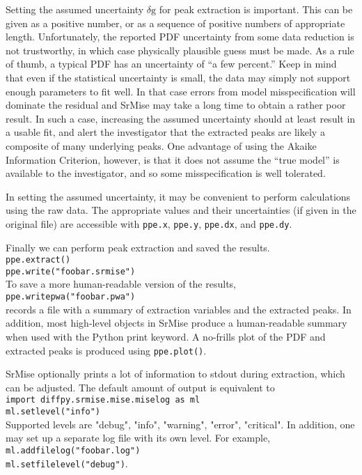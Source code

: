\documentclass[12pt]{article}
\newcommand{\dg}{\ensuremath{\delta\mathrm{g}}}
\begin{document}
Setting the assumed uncertainty $\dg$ for peak extraction is important.  This can be given as a positive number, or as a sequence of positive numbers of appropriate length.  Unfortunately, the reported PDF uncertainty from some data reduction is not trustworthy, in which case physically plausible guess must be made.  As a rule of thumb, a typical PDF has an uncertainty of ``a few percent.''  Keep in mind that even if the statistical uncertainty is small, the data may simply not support enough parameters to fit well.  In that case errors from model misspecification will dominate the residual and {\sc SrMise} may take a long time to obtain a rather poor result.  In such a case, increasing the assumed uncertainty should at least result in a usable fit, and alert the investigator that the extracted peaks are likely a composite of many underlying peaks.  One advantage of using the Akaike Information Criterion, however, is that it does not assume the ``true model'' is available to the investigator, and so some misspecification is well tolerated.

In setting the assumed uncertainty, it may be convenient to perform calculations using the raw data.  The appropriate values and their uncertainties (if given in the original file) are accessible with \texttt{ppe.x}, \texttt{ppe.y}, \texttt{ppe.dx}, and \texttt{ppe.dy}.

Finally we can perform peak extraction and saved the results.\\
\texttt{ppe.extract()}\\
\texttt{ppe.write("foobar.srmise")}\\
To save a more human-readable version of the results,\\
\texttt{ppe.writepwa("foobar.pwa")}\\
records a file with a summary of extraction variables and the extracted peaks.  In addition, most high-level objects in {\sc SrMise} produce a human-readable summary when used with the Python print keyword.  A no-frills plot of the PDF and extracted peaks is produced using \texttt{ppe.plot()}.

{\sc SrMise} optionally prints a lot of information to stdout during extraction, which can be adjusted.  The default amount of output is equivalent to\\
\texttt{import diffpy.srmise.mise.miselog as ml}\\
\texttt{ml.setlevel("info")}\\
Supported levels are "debug", "info", "warning", "error", "critical".  In addition, one may set up a separate log file with its own level.  For example,\\
\texttt{ml.addfilelog("foobar.log")}\\
\texttt{ml.setfilelevel("debug")}.
\end{document}
